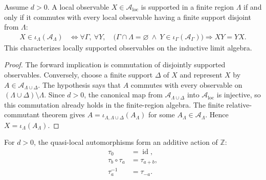 \begin{lemma}
    \label{thm:qca_algebraic_local_relative_commutant}
    \leanok
    Assume $d>0$. A local observable $X\in\mathcal A_{\mathrm{loc}}$ is
    supported in a finite region $\Lambda$ if and only if it commutes with every
    local observable having a finite support disjoint from $\Lambda$:
    \begin{align}
        X\in\iota_\Lambda(\mathcal A_\Lambda)
         & \iff
        \forall \Gamma,\ \forall Y,\quad
        \bigl(\Gamma\cap\Lambda=\varnothing\ \land\
        Y\in\iota_\Gamma(\mathcal A_\Gamma)\bigr)\Longrightarrow XY=YX.
    \end{align}
    This characterizes locally supported observables on the inductive limit
    algebra.
\end{lemma}

\begin{proof}\leanok
    The forward implication is commutation of disjointly supported observables.
    Conversely, choose a finite support $\Delta$ of $X$ and represent $X$ by
    $A\in\mathcal A_{\Lambda\cup\Delta}$. The hypothesis says that $A$ commutes
    with every observable on $(\Lambda\cup\Delta)\setminus\Lambda$. Since
    $d>0$, the canonical map from $\mathcal A_{\Lambda\cup\Delta}$ into
    $\mathcal A_{\mathrm{loc}}$ is injective, so this commutation already holds
    in the finite-region algebra. The finite relative-commutant theorem gives
    $A=\iota_{\Lambda,\Lambda\cup\Delta}(A_\Lambda)$ for some
    $A_\Lambda\in\mathcal A_\Lambda$. Hence
    $X=\iota_\Lambda(A_\Lambda)$.
\end{proof}

\begin{lemma}
    \label{lem:qca_quasi_local_translation_action}
    \leanok
    For $d>0$, the quasi-local automorphisms form an additive action of
    $\mathbb Z$:
    \begin{align}
        \tau_0            & =\operatorname{id}, \\
        \tau_b\circ\tau_a & =\tau_{a+b},        \\
        \tau_a^{-1}       & =\tau_{-a}.
    \end{align}
\end{lemma}

